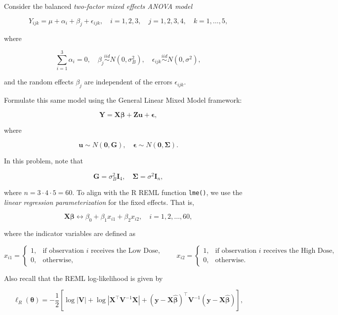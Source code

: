 \documentclass[letterpaper]{article}
\begin{document}
		Consider the balanced \textit{two-factor mixed effects ANOVA model}
		
		\[
		Y_{ijk} = \mu + \alpha_i + \beta_j + \epsilon_{ijk}, \quad i = 1, 2, 3, \quad j = 1, 2, 3, 4, \quad k = 1, \ldots, 5,
		\]
		
		where
		
		\[
		\sum_{i=1}^{3} \alpha_i = 0, \quad \beta_j \overset{iid}{\sim} N(0, \sigma^2_B), \quad \epsilon_{ijk} \overset{iid}{\sim} N(0, \sigma^2),
		\]
		
		and the random effects $\beta_j$ are independent of the errors $\epsilon_{ijk}$.
		
		Formulate this same model using the {General Linear Mixed Model} framework:
		
		\[
		\mathbf{Y} = \mathbf{X}\boldsymbol{\beta} + \mathbf{Z}\mathbf{u} + \boldsymbol{\epsilon},
		\]
		
		where
		
		\[
		\mathbf{u} \sim N(\mathbf{0}, \mathbf{G}), \quad \boldsymbol{\epsilon} \sim N(\mathbf{0}, \boldsymbol{\Sigma}).
		\]
		
		In this problem, note that
		
		\[
		\mathbf{G} = \sigma^2_B \mathbf{I}_4, \quad \boldsymbol{\Sigma} = \sigma^2 \mathbf{I}_n,
		\]
		
		where $n = 3 \cdot 4 \cdot 5 = 60$. To align with the R REML function \texttt{lme()}, we use the \textit{linear regression parameterization} for the fixed effects. That is,
		
		\[
		\mathbf{X}\boldsymbol{\beta} \longleftrightarrow \beta_0 + \beta_1 x_{i1} + \beta_2 x_{i2}, \quad i = 1, 2, \ldots, 60,
		\]
		
		where the indicator variables are defined as
		
		\[
		x_{i1} = \begin{cases} 1, & \text{if observation } i \text{ receives the Low Dose,} \\ 0, & \text{otherwise,} \end{cases} \qquad x_{i2} = \begin{cases} 1, & \text{if observation } i \text{ receives the High Dose,} \\ 0, & \text{otherwise.} \end{cases}
		\]
		
		Also recall that the REML log-likelihood is given by
		
		\[
		\ell_R(\boldsymbol{\theta}) = -\frac{1}{2}\left[\log|\mathbf{V}| + \log|\mathbf{X}^\top \mathbf{V}^{-1}\mathbf{X}| + (\mathbf{y} - \mathbf{X}\hat{\boldsymbol{\beta}})^\top \mathbf{V}^{-1}(\mathbf{y} - \mathbf{X}\hat{\boldsymbol{\beta}})\right],
		\]
		
\end{document}
